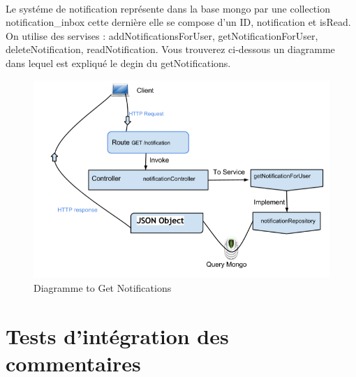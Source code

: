 \paragraph{}
Le systéme de notification représente dans la base mongo par une collection notification\_inbox cette dernière elle se compose d'un ID, notification et isRead.
On utilise des servises : addNotificationsForUser, getNotificationForUser, deleteNotification, readNotification.
Vous trouverez ci-dessous un diagramme dans lequel est expliqué le degin du getNotifications.
\begin{figure}[H]
        \centering
                \centering
                \includegraphics[width=\textwidth]{Notifications.png}
               \caption{Diagramme to Get Notifications}
		\label{fig:Diagramme to Get Notifications}
\end{figure}
\section{Tests d'intégration des commentaires}
